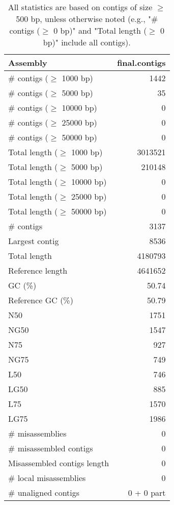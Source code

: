 \documentclass[12pt,a4paper]{article}
\begin{document}
\begin{table}[ht]
\begin{center}
\caption{All statistics are based on contigs of size $\geq$ 500 bp, unless otherwise noted (e.g., "\# contigs ($\geq$ 0 bp)" and "Total length ($\geq$ 0 bp)" include all contigs).}
\begin{tabular}{|l*{1}{|r}|}
\hline
Assembly & final.contigs \\ \hline
\# contigs ($\geq$ 1000 bp) & 1442 \\ \hline
\# contigs ($\geq$ 5000 bp) & 35 \\ \hline
\# contigs ($\geq$ 10000 bp) & 0 \\ \hline
\# contigs ($\geq$ 25000 bp) & 0 \\ \hline
\# contigs ($\geq$ 50000 bp) & 0 \\ \hline
Total length ($\geq$ 1000 bp) & 3013521 \\ \hline
Total length ($\geq$ 5000 bp) & 210148 \\ \hline
Total length ($\geq$ 10000 bp) & 0 \\ \hline
Total length ($\geq$ 25000 bp) & 0 \\ \hline
Total length ($\geq$ 50000 bp) & 0 \\ \hline
\# contigs & 3137 \\ \hline
Largest contig & 8536 \\ \hline
Total length & 4180793 \\ \hline
Reference length & 4641652 \\ \hline
GC (\%) & 50.74 \\ \hline
Reference GC (\%) & 50.79 \\ \hline
N50 & 1751 \\ \hline
NG50 & 1547 \\ \hline
N75 & 927 \\ \hline
NG75 & 749 \\ \hline
L50 & 746 \\ \hline
LG50 & 885 \\ \hline
L75 & 1570 \\ \hline
LG75 & 1986 \\ \hline
\# misassemblies & 0 \\ \hline
\# misassembled contigs & 0 \\ \hline
Misassembled contigs length & 0 \\ \hline
\# local misassemblies & 0 \\ \hline
\# unaligned contigs & 0 + 0 part \\ \hline

\end{tabular}
\end{center}
\end{table}
\end{document}
